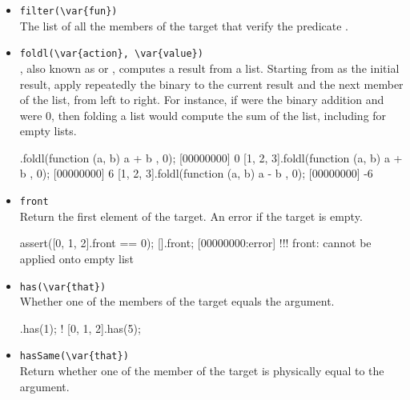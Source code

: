 \begin{itemize}
\item \lstinline|filter(\var{fun})|\\
  The list of all the members of the target that verify the predicate
  .


\item \lstinline|foldl(\var{action}, \var{value})|\\
  ,
  also known as  or , computes a result
  from a list.  Starting from  as the initial result, apply
  repeatedly the binary  to the current result and the
  next member of the list, from left to right.  For instance, if
   were the binary addition and  were 0, then
  folding a list would compute the sum of the list, including for
  empty lists.

\begin{urbiscript}[firstnumber=last]
[].foldl(function (a, b) { a + b }, 0);
[00000000] 0
[1, 2, 3].foldl(function (a, b) { a + b }, 0);
[00000000] 6
[1, 2, 3].foldl(function (a, b) { a - b }, 0);
[00000000] -6
\end{urbiscript}

\item \lstinline|front|\\
  Return the first element of the target. An error if the target is
  empty.

\begin{urbiscript}[firstnumber=last]
assert([0, 1, 2].front == 0);
[].front;
[00000000:error] !!! front: cannot be applied onto empty list
\end{urbiscript}

\item \lstinline|has(\var{that})|\\
  Whether one of the members of the target equals the argument.

\begin{urbiassert}[firstnumber=last]
[0, 1, 2].has(1);
! [0, 1, 2].has(5);
\end{urbiassert}

\item \lstinline|hasSame(\var{that})|\\
  Return whether one of the member of the target is physically equal
  to the argument.


\end{itemize}
